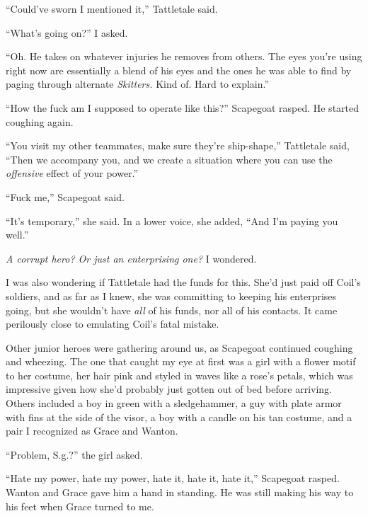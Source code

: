 ``Could've sworn I mentioned it,'' Tattletale said.



``What's going on?'' I asked.



``Oh.  He takes on whatever injuries he removes from others.  The eyes you're using right now are essentially a blend of his eyes and the ones he was able to find by paging through alternate \emph{Skitters.  }Kind of.  Hard to explain.''



``How the fuck am I supposed to operate like this?'' Scapegoat rasped.  He started coughing again.



``You visit my other teammates, make sure they're ship-shape,'' Tattletale said, ``Then we accompany you, and we create a situation where you can use the \emph{offensive} effect of your power.''



``Fuck me,'' Scapegoat said.



``It's temporary,'' she said.  In a lower voice, she added, ``And I'm paying you well.''



\emph{A corrupt hero?  Or just an enterprising one?}  I wondered.



I was also wondering if Tattletale had the funds for this.  She'd just paid off Coil's soldiers, and as far as I knew, she was committing to keeping his enterprises going, but she wouldn't have \emph{all} of his funds, nor all of his contacts.  It came perilously close to emulating Coil's fatal mistake.



Other junior heroes were gathering around us, as Scapegoat continued coughing and wheezing.  The one that caught my eye at first was a girl with a flower motif to her costume, her hair pink and styled in waves like a rose's petals, which was impressive given how she'd probably just gotten out of bed before arriving.  Others included a boy in green with a sledgehammer, a guy with plate armor with fins at the side of the visor, a boy with a candle on his tan costume, and a pair I recognized as Grace and Wanton.



``Problem, S.g.?'' the girl asked.



``Hate my power, hate my power, hate it, hate it, hate it,'' Scapegoat rasped.  Wanton and Grace gave him a hand in standing.  He was still making his way to his feet when Grace turned to me.



